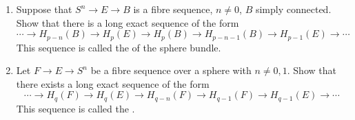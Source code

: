 \begin{exercise}\label{ex:gysinwang}
	\leavevmode
	\begin{enumerate}
		\item Suppose that $S^n \to E \to B$ is a fibre sequence, $n \neq 0$, $B$ simply connected.
			Show that there is a long exact sequence of the form
			\begin{equation*}
				\cdots \to H_{p - n}(B) \to H_p(E) \to H_p(B) \to H_{p - n - 1}(B) \to H_{p - 1}(E) \to \cdots
			\end{equation*}
			This sequence is called the  of the sphere bundle.
		\item Let $F \to E \to S^n$ be a fibre sequence over a sphere with $n \neq 0, 1$.
			Show that there exists a long exact sequence of the form
			\begin{equation*}
				\cdots \to H_q(F) \to H_q(E) \to H_{q - n}(F) \to H_{q - 1}(F) \to H_{q - 1}(E) \to \cdots
			\end{equation*}
			This sequence is called the .
	\end{enumerate}
\end{exercise}
